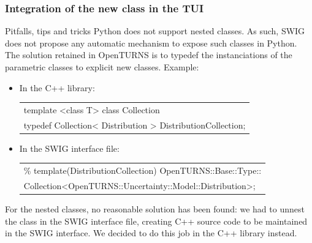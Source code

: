 \documentclass[8pt]{beamer}
\begin{document}
\begin{frame}
  \frametitle{Integration of the new class in the TUI}
  \begin{block}{Pitfalls, tips and tricks}
    Python does not support nested classes. As such, SWIG does  not propose any automatic mechanism to expose such classes in Python. The solution retained in OpenTURNS is to typedef the instanciations of the parametric classes to explicit new classes. Example:
    \begin{itemize}
    \item In the C++ library:
      \small
      \begin{tabular}{l}
        \ttfamily template <class T> class Collection \\
        \ttfamily typedef Collection< Distribution > DistributionCollection;
      \end{tabular}
      \normalsize
    \item In the SWIG interface file:
      \small
      \begin{tabular}{l}
        \ttfamily \% template(DistributionCollection) OpenTURNS::Base::Type::\\
        \ttfamily Collection<OpenTURNS::Uncertainty::Model::Distribution>;
      \end{tabular}
      \normalsize
    \end{itemize}
    For the nested classes, no reasonable solution has been found: we had to unnest the class in the SWIG interface file, creating C++ source code to be maintained in the SWIG interface. We decided to do this job in the C++ library instead.
  \end{block}
\end{frame}
\end{document}
